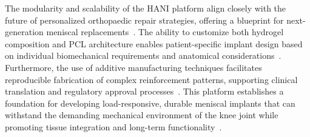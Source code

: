 The modularity and scalability of the HANI platform align closely with the future of personalized orthopaedic repair strategies, offering a blueprint for next-generation meniscal replacements~\cite{filardo2019patientspecificmeniscus, gupta2020meniscaltissue}. The ability to customize both hydrogel composition and PCL architecture enables patient-specific implant design based on individual biomechanical requirements and anatomical considerations~\cite{makris2011kneemeniscus}. Furthermore, the use of additive manufacturing techniques facilitates reproducible fabrication of complex reinforcement patterns, supporting clinical translation and regulatory approval processes~\cite{elkommos2025hybridhydrogels}. This platform establishes a foundation for developing load-responsive, durable meniscal implants that can withstand the demanding mechanical environment of the knee joint while promoting tissue integration and long-term functionality~\cite{bulle2021humanmeniscus}.












































































